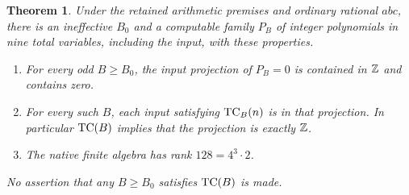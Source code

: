 \documentclass[11pt,a4paper]{article}
\newtheorem{theorem}{Theorem}[section]
\begin{document}
\begin{theorem}\label{thm:transfer}
Under the retained arithmetic premises and ordinary rational $abc$,
there is an ineffective $B_0$ and a computable family $P_B$ of
integer polynomials in nine total variables, including the input,
with these properties.
\begin{enumerate}
\item For every odd $B\ge B_0$, the input projection of $P_B=0$
is contained in $\mathbb Z$ and contains zero.
\item For every such $B$, each input satisfying $\operatorname{TC}_B(n)$ is
in that projection. In particular $\operatorname{TC}(B)$ implies that the
projection is exactly $\mathbb Z$.
\item The native finite algebra has rank $128=4^3\cdot2$.
\end{enumerate}
No assertion that any $B\ge B_0$ satisfies $\operatorname{TC}(B)$ is made.
\end{theorem}
\end{document}

